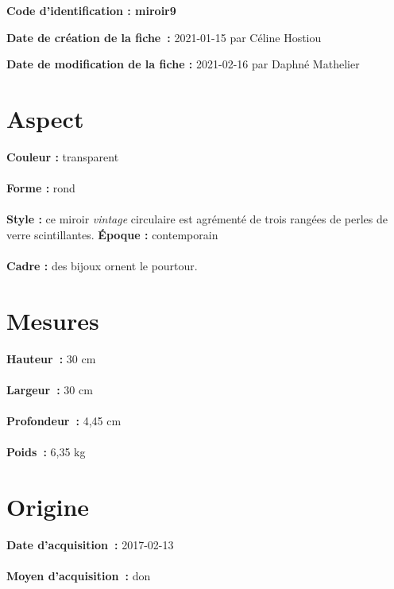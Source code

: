 
     {\bf \huge Code d’identification : miroir9} \\
    \newline \hr \begin{center} 
       
    \end{center} 
    \begin{itemize}
    
    \footnotesize {\item {\bf Date de création de la fiche :} 2021-01-15
    {par Céline Hostiou}} 
    \footnotesize {\item {\bf Date de modification de la fiche :} 2021-02-16
    {par Daphné Mathelier} \\}
    \end{itemize}
   \hr 
    \section* {Aspect} 
    {\bf \large Couleur :} transparent
    \\ \\ {\bf \large Forme :} rond 
    \\ \\ {\bf \large Style :} ce miroir 
    {\em {vintage}}
   circulaire est agrémenté de trois
            rangées de perles de verre scintillantes.  
        {\bf \large Époque :} contemporain 
    \\ \\ {\bf \large Cadre :} des bijoux ornent le pourtour. 
    \section* {Mesures}
     {\bf \large Hauteur :} 30 cm
   \\ \\ {\bf \large Largeur :} 30 cm 
   \\ \\ {\bf \large Profondeur :} 4,45 cm  
   \\ \\ {\bf \large Poids :} 6,35 kg
  
    \section* {Origine}
    {\bf \large Date d’acquisition :} 2017-02-13 \\ \\
    {\bf \large Moyen d’acquisition :} don
